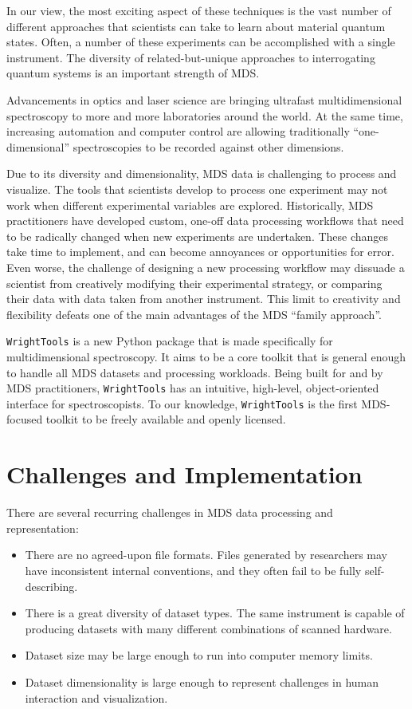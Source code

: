 In our view, the most exciting aspect of these techniques is the vast
number of different approaches that scientists can take to learn about
material quantum states. Often, a number of these experiments can be
accomplished with a single instrument. The diversity of
related-but-unique approaches to interrogating quantum systems is an
important strength of MDS.

Advancements in optics and laser science are bringing ultrafast
multidimensional spectroscopy to more and more laboratories around the
world. At the same time, increasing automation and computer control are
allowing traditionally ``one-dimensional'' spectroscopies to be recorded
against other dimensions.

Due to its diversity and dimensionality, MDS data is challenging to
process and visualize. The tools that scientists develop to process one
experiment may not work when different experimental variables are
explored. Historically, MDS practitioners have developed custom, one-off
data processing workflows that need to be radically changed when new
experiments are undertaken. These changes take time to implement, and
can become annoyances or opportunities for error. Even worse, the
challenge of designing a new processing workflow may dissuade a
scientist from creatively modifying their experimental strategy, or
comparing their data with data taken from another instrument. This limit
to creativity and flexibility defeats one of the main advantages of the
MDS ``family approach''.

\texttt{WrightTools} is a new Python package that is made specifically
for multidimensional spectroscopy. It aims to be a core toolkit that is
general enough to handle all MDS datasets and processing workloads.
Being built for and by MDS practitioners, \texttt{WrightTools} has an
intuitive, high-level, object-oriented interface for spectroscopists. To
our knowledge, \texttt{WrightTools} is the first MDS-focused toolkit to
be freely available and openly licensed.

\hypertarget{challenges-and-implementation}{%
\section{Challenges and
Implementation}\label{challenges-and-implementation}}

There are several recurring challenges in MDS data processing and
representation:

\begin{itemize}
\item
  There are no agreed-upon file formats. Files generated by researchers
  may have inconsistent internal conventions, and they often fail to be
  fully self-describing.
\item
  There is a great diversity of dataset types. The same instrument is
  capable of producing datasets with many different combinations of
  scanned hardware.
\item
  Dataset size may be large enough to run into computer memory limits.
\item
  Dataset dimensionality is large enough to represent challenges in
  human interaction and visualization.
\end{itemize}

